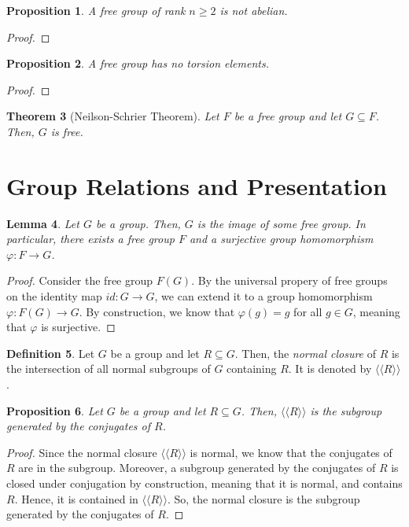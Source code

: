 \documentclass[a4paper, openany]{memoir}
\theoremstyle{definition}
\newtheorem{definition}{Definition}[section]
\theoremstyle{plain}
\newtheorem{theorem}[definition]{Theorem}
\newtheorem{lemma}[definition]{Lemma}
\newtheorem{proposition}[definition]{Proposition}
\begin{document}
    \begin{proposition}
        A free group of rank $n \geq 2$ is not abelian.
    \end{proposition}
    \begin{proof}
        
    \end{proof}

    \begin{proposition}
        A free group has no torsion elements.
    \end{proposition}
    \begin{proof}
        
    \end{proof}

    \begin{theorem}[Neilson-Schrier Theorem]
        Let $F$ be a free group and let $G \subseteq F$. Then, $G$ is free.
    \end{theorem}
    
    \newpage

    \section{Group Relations and Presentation}
    \begin{lemma}
        Let $G$ be a group. Then, $G$ is the image of some free group. In particular, there exists a free group $F$ and a surjective group homomorphism $\varphi \colon F \to G$.
    \end{lemma}
    \begin{proof}
        Consider the free group $F(G)$. By the universal propery of free groups on the identity map $id \colon G \to G$, we can extend it to a group homomorphism $\varphi \colon F(G) \to G$. By construction, we know that $\varphi(g) = g$ for all $g \in G$, meaning that $\varphi$ is surjective.
    \end{proof}

    \begin{definition}
        Let $G$ be a group and let $R \subseteq G$. Then, the \emph{normal closure} of $R$ is the intersection of all normal subgroups of $G$ containing $R$. It is denoted by $\langle \langle R \rangle \rangle$.
    \end{definition}

    \begin{proposition}
        Let $G$ be a group and let $R \subseteq G$. Then, $\langle \langle R \rangle \rangle$ is the subgroup generated by the conjugates of $R$.
    \end{proposition}
    \begin{proof}
        Since the normal closure $\langle \langle R \rangle \rangle$ is normal, we know that the conjugates of $R$ are in the subgroup. Moreover, a subgroup generated by the conjugates of $R$ is closed under conjugation by construction, meaning that it is normal, and contains $R$. Hence, it is contained in $\langle\langle R \rangle\rangle$. So, the normal closure is the subgroup generated by the conjugates of $R$.
    \end{proof}
\end{document}
